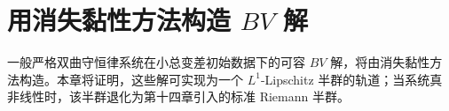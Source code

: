 \documentclass[../main.tex]{subfiles}
\begin{document}
\chapter{用消失黏性方法构造 $BV$ 解}\label{chapter:ch15-消失黏性构造bv解}

一般严格双曲守恒律系统在小总变差初始数据下的可容 $BV$ 解，将由消失黏性方法构造。本章将证明，这些解可实现为一个 $L^1$-Lipschitz 半群的轨道；当系统真非线性时，该半群退化为第十四章引入的标准 Riemann 半群。










\end{document}
